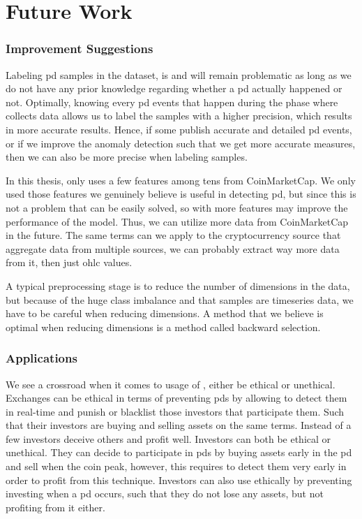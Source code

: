 \section{Future Work}

\subsubsection{Improvement Suggestions}
Labeling \ac{pd} samples in the dataset, is and will remain problematic as long as we do not have any prior knowledge regarding whether a \ac{pd} actually happened or not. Optimally, knowing every \ac{pd} events that happen during the phase where \project collects data allows us to label the samples with a higher precision, which results in more accurate results. Hence, if some publish accurate and detailed \ac{pd} events, or if we improve the anomaly detection such that we get more accurate measures, then we can also be more precise when labeling samples.

In this thesis, \project only uses a few features among tens from CoinMarketCap. We only used those features we genuinely believe is useful in detecting \ac{pd}, but since this is not a problem that can be easily solved, so with more features may improve the performance of the model. Thus, we can utilize more data from CoinMarketCap in the future. The same terms can we apply to the cryptocurrency source that aggregate data from multiple sources, we can probably extract way more data from it, then just \ac{ohlc} values.

A typical preprocessing stage is to reduce the number of dimensions in the data, but because of the huge class imbalance and that samples are timeseries data, we have to be careful when reducing dimensions. A method that we believe is optimal when reducing dimensions is a method called backward selection.

\subsubsection{Applications}
We see a crossroad when it comes to usage of \project, either be ethical or unethical. Exchanges can be ethical in terms of preventing \acp{pd} by allowing \project to detect them in real-time and punish or blacklist those investors that participate them. Such that their investors are buying and selling assets on the same terms. Instead of a few investors deceive others and profit well. Investors can both be ethical or unethical. They can decide to participate in \acp{pd} by buying assets early in the \ac{pd} and sell when the coin peak, however, this requires \project to detect them very early in order to profit from this technique. Investors can also use \project ethically by preventing investing when a \ac{pd} occurs, such that they do not lose any assets, but not profiting from it either.